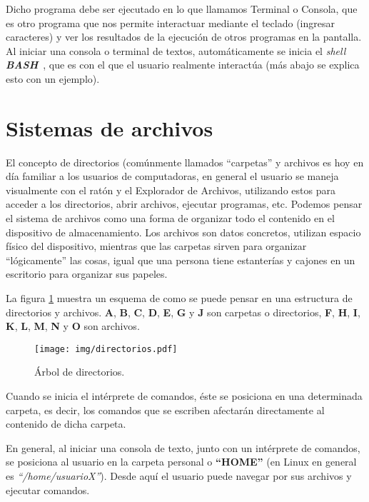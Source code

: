 \documentclass[12pt]{article}
\newcommand{\bash}{\textbf{\emph{BASH}}\ }
\begin{document}
Dicho programa debe ser ejecutado en lo que llamamos Terminal o Consola, que
es otro programa que nos permite interactuar mediante el teclado (ingresar
caracteres) y ver los resultados de la ejecución de otros programas en la
pantalla. Al iniciar una consola o terminal de textos, automáticamente se
inicia el \emph{shell} \bash, que es con el que el usuario realmente
interactúa (más abajo se explica esto con un ejemplo).

\section{Sistemas de archivos}

El concepto de directorios (comúnmente llamados ``carpetas'' y archivos es hoy
en día familiar a los usuarios de computadoras, en general el usuario se
maneja visualmente con el ratón y el Explorador de Archivos, utilizando estos
para acceder a los directorios, abrir archivos, ejecutar programas, etc. Podemos
pensar el sistema de archivos como una forma de organizar todo el contenido en
el dispositivo de almacenamiento. Los archivos son datos concretos, utilizan
espacio físico del dispositivo, mientras que las carpetas sirven para
organizar ``lógicamente'' las cosas, igual que una persona tiene estanterías y
cajones en un escritorio para organizar sus papeles.

La figura \ref{arbolDirectorios} muestra un esquema de como se puede pensar en
una estructura de directorios y archivos. \textbf{A}, \textbf{B}, \textbf{C},
\textbf{D}, \textbf{E}, \textbf{G} y \textbf{J} son carpetas o directorios,
\textbf{F}, \textbf{H}, \textbf{I}, \textbf{K}, \textbf{L}, \textbf{M},
\textbf{N} y \textbf{O} son archivos.

\begin{figure}[!htb]

	\centering

	\texttt{[image: img/directorios.pdf]}

	\caption{Árbol de directorios.}

	\label{arbolDirectorios}

\end{figure}

Cuando se inicia el intérprete de comandos, éste se posiciona en una
determinada carpeta, es decir, los comandos que se escriben afectarán
directamente al contenido de dicha carpeta.

En general, al iniciar una consola de texto, junto con un intérprete de
comandos, se posiciona al usuario en la carpeta personal o \textbf{``HOME''}
(en Linux en general es \emph{``/home/usuarioX''}). Desde aquí el usuario
puede navegar por sus archivos y ejecutar comandos.
\end{document}
